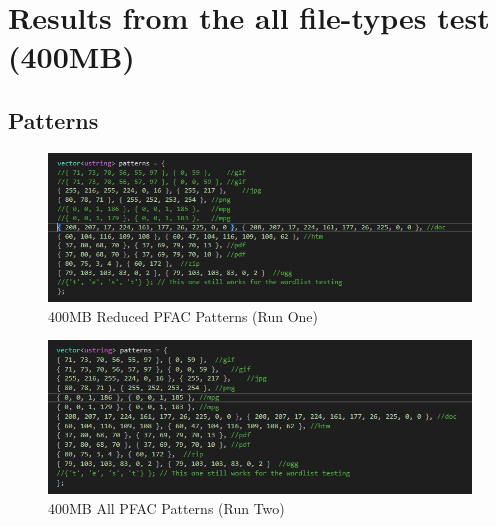 \section{Results from the all file-types test (400MB)}
\subsection{Patterns}
\label{sec:400MBAppendixPatterns}
\begin{figure}[!ht]
    \centering
    \includegraphics[width=\linewidth]{Images/Tests/2GB/Aletheia-Patts.png}
    \caption{400\ac{MB} Reduced \ac{PFAC} Patterns (Run One)}
    \label{fig:runOnePatts}
\end{figure}
\begin{figure}[!ht]
    \centering
    \includegraphics[width=\linewidth]{Images/Tests/400MB/runTwoPatt.png}
    \caption{400\ac{MB} All \ac{PFAC} Patterns (Run Two)}
    \label{fig:runTwoPatts}
\end{figure}
\newpage

